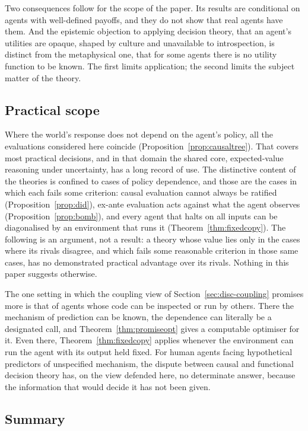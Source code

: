 Two consequences follow for the scope of the paper. Its results are conditional on agents with
well-defined payoffs, and they do not show that real agents have them. And the epistemic objection
to applying decision theory, that an agent's utilities are opaque, shaped by culture and unavailable
to introspection, is distinct from the metaphysical one, that for some agents there is no utility
function to be known. The first limits application; the second limits the subject matter of the
theory.

\subsection{Practical scope}\label{sec:disc-practice}

Where the world's response does not depend on the agent's policy, all the evaluations considered here
coincide (Proposition~\ref{prop:causaltree}). That covers most practical decisions, and in that domain
the shared core, expected-value reasoning under uncertainty, has a long record of use. The distinctive
content of the theories is confined to cases of policy dependence, and those are the cases in which
each fails some criterion: causal evaluation cannot always be ratified (Proposition~\ref{prop:did}),
ex-ante evaluation acts against what the agent observes (Proposition~\ref{prop:bomb}), and every agent
that halts on all inputs can be diagonalised by an environment that runs it
(Theorem~\ref{thm:fixedcopy}). The following is an argument, not a result: a theory whose value lies
only in the cases where its rivals disagree, and which fails some reasonable criterion in those same
cases, has no demonstrated practical advantage over its rivals. Nothing in this paper suggests
otherwise.

The one setting in which the coupling view of Section~\ref{sec:disc-coupling} promises more is that
of agents whose code can be inspected or run by others. There the mechanism of prediction can be
known, the dependence can literally be a designated call, and Theorem~\ref{thm:promiseopt} gives a
computable optimiser for it. Even there, Theorem~\ref{thm:fixedcopy} applies whenever the environment
can run the agent with its output held fixed. For human agents facing hypothetical predictors of
unspecified mechanism, the dispute between causal and functional decision theory has, on the view
defended here, no determinate answer, because the information that would decide it has not been
given.

\subsection{Summary}

